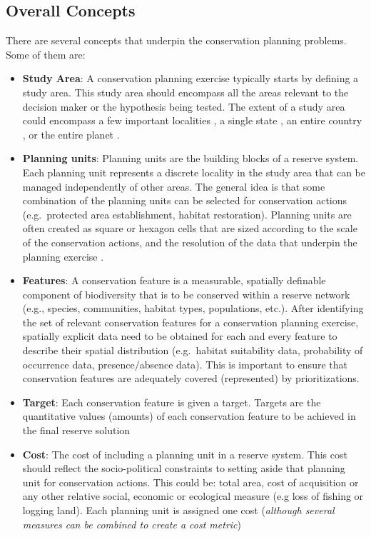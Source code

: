\documentclass[
  12pt,
]{book}
\providecommand{\tightlist}{%
  \setlength{\itemsep}{0pt}\setlength{\parskip}{0pt}}
\begin{document}
\hypertarget{overall-concepts}{%
\subsection{Overall Concepts}\label{overall-concepts}}

There are several concepts that underpin the conservation planning problems. Some of them are:

\begin{itemize}
\tightlist
\item
  \textbf{Study Area}: A conservation planning exercise typically starts by defining a study area. This study area should encompass all the areas relevant to the decision maker or the hypothesis being tested. The extent of a study area could encompass a few important localities \citep[e.g.][]{r18}, a single state \citep[e.g.][]{r17}, an entire country \citep{r19}, or the entire planet \citep{r20}.
\item
  \textbf{Planning units}: Planning units are the building blocks of a reserve system. Each planning unit represents a discrete locality in the study area that can be managed independently of other areas. The general idea is that some combination of the planning units can be selected for conservation actions (e.g.~protected area establishment, habitat restoration). Planning units are often created as square or hexagon cells that are sized according to the scale of the conservation actions, and the resolution of the data that underpin the planning exercise \citep[but see][]{r5}.
\item
  \textbf{Features}: A conservation feature is a measurable, spatially definable component of biodiversity that is to be conserved within a reserve network (e.g., species, communities, habitat types, populations, etc.). After identifying the set of relevant conservation features for a conservation planning exercise, spatially explicit data need to be obtained for each and every feature to describe their spatial distribution (e.g.~habitat suitability data, probability of occurrence data, presence/absence data). This is important to ensure that conservation features are adequately covered (represented) by prioritizations.
\item
  \textbf{Target}: Each conservation feature is given a target. Targets are the quantitative values (amounts) of each conservation feature to be achieved in the final reserve solution
\item
  \textbf{Cost}: The cost of including a planning unit in a reserve system. This cost should reflect the socio-political constraints to setting aside that planning unit for conservation actions. This could be: total area, cost of acquisition or any other relative social, economic or ecological measure (e.g loss of fishing or logging land). Each planning unit is assigned one cost (\emph{although several measures can be combined to create a cost metric})

\end{itemize}
\end{document}

